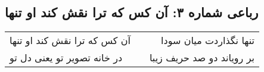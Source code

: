 \begin{center}
\section*{رباعی شماره ۳: آن کس که ترا نقش کند او تنها}
\label{sec:0003}
\begin{longtable}{l p{0.5cm} r}
آن کس که ترا نقش کند او تنها
&&
تنها نگذاردت میان سودا
\\
در خانه تصویر تو یعنی دل تو
&&
بر رویاند دو صد حریف زیبا
\\
\end{longtable}
\end{center}
